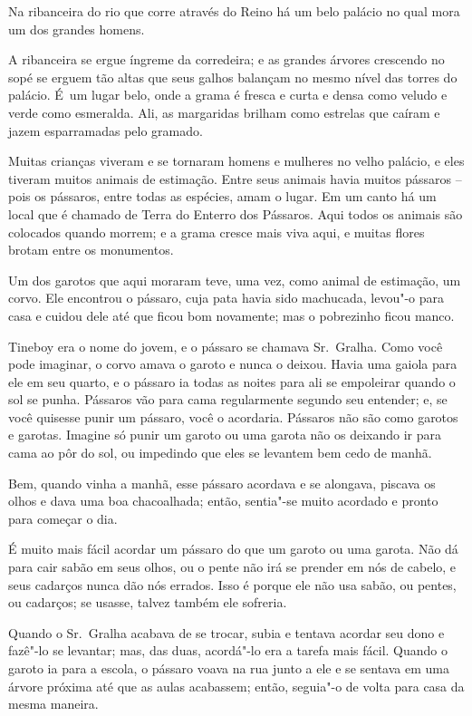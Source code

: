  

Na ribanceira do rio que corre através do Reino há um belo palácio no
qual mora um dos grandes homens.

A ribanceira se ergue íngreme da corredeira; e as grandes árvores
crescendo no sopé se erguem tão altas que seus galhos balançam no mesmo
nível das torres do palácio. É~um lugar belo, onde a grama é fresca e
curta e densa como veludo e verde como esmeralda. Ali, as margaridas
brilham como estrelas que caíram e jazem esparramadas pelo gramado.

Muitas crianças viveram e se tornaram homens e mulheres no velho
palácio, e eles tiveram muitos animais de estimação. Entre seus animais
havia muitos pássaros -- pois os pássaros, entre todas as espécies, amam
o lugar. Em um canto há um local que é chamado de Terra do Enterro dos
Pássaros. Aqui todos os animais são colocados quando morrem; e a grama
cresce mais viva aqui, e muitas flores brotam entre os monumentos.

Um dos garotos que aqui moraram teve, uma vez, como animal de estimação,
um corvo. Ele encontrou o pássaro, cuja pata havia sido machucada,
levou"-o para casa e cuidou dele até que ficou bom novamente; mas o
pobrezinho ficou manco.

Tineboy era o nome do jovem, e o pássaro se chamava Sr.~Gralha. Como
você pode imaginar, o corvo amava o garoto e nunca o deixou. Havia uma
gaiola para ele em seu quarto, e o pássaro ia todas as noites para ali
se empoleirar quando o sol se punha. Pássaros vão para cama regularmente
segundo seu entender; e, se você quisesse punir um pássaro, você o
acordaria. Pássaros não são como garotos e garotas. Imagine só punir um
garoto ou uma garota não os deixando ir para cama ao pôr do sol, ou
impedindo que eles se levantem bem cedo de manhã.

Bem, quando vinha a manhã, esse pássaro acordava e se alongava, piscava
os olhos e dava uma boa chacoalhada; então, sentia"-se muito acordado e
pronto para começar o dia.

É muito mais fácil acordar um pássaro do que um garoto ou uma garota. Não dá para cair sabão em seus olhos, ou o pente não irá se prender em nós
de cabelo, e seus cadarços nunca dão nós errados. Isso é porque ele não
usa sabão, ou pentes, ou cadarços; se usasse, talvez também ele
sofreria.

Quando o Sr.~Gralha acabava de se trocar, subia e tentava acordar
seu dono e fazê"-lo se levantar; mas, das duas, acordá"-lo era a tarefa
mais fácil. Quando o garoto ia para a escola, o pássaro voava na rua
junto a ele e se sentava em uma árvore próxima até que as aulas
acabassem; então, seguia"-o de volta para casa da mesma maneira.

